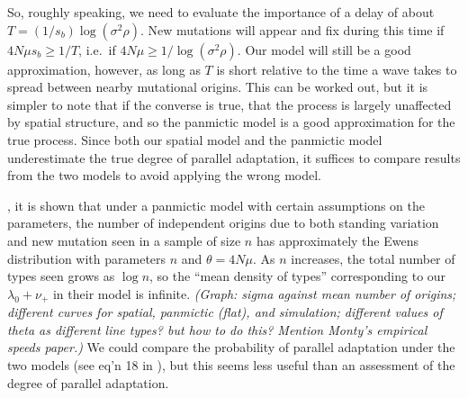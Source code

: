 \documentclass{article}
\newcommand{\marginnote}[1]{{\it\color{red}(#1)}}
\begin{document}
So, roughly speaking, we need to evaluate the importance of a delay of about $T = (1/s_b) \log (\sigma^2 \rho)$.
New mutations will appear and fix during this time if $4N\mu s_b \ge 1/T$,
i.e.\ if $4 N \mu \ge 1/\log (\sigma^2 \rho)$.
Our model will still be a good approximation, however, 
as long as $T$ is short relative to the time a wave takes to spread between nearby mutational origins.
This can be worked out,
but it is simpler to note that if the converse is true, 
that the process is largely unaffected by spatial structure,
and so the panmictic model is a good approximation for the true process.
Since both our spatial model and the panmictic model underestimate the true degree of parallel adaptation,
it suffices to compare results from the two models to avoid applying the wrong model.


\citet{softsweepsII}, it is shown that under a panmictic model with certain assumptions on the parameters,
the number of independent origins due to both standing variation and new mutation seen in a sample of size $n$
has approximately the Ewens distribution with parameters $n$ and $\theta = 4 N \mu$.
As $n$ increases, the total number of types seen grows as $\log n$, 
so the ``mean density of types'' corresponding to our $\lambda_0 + \nu_+$ in their model is infinite.
\marginnote{Graph: sigma against mean number of origins; different curves for spatial, panmictic (flat), and simulation;
different values of theta as different line types?  but how to do this?
Mention Monty's empirical speeds paper.}
We could compare the probability of parallel adaptation under the two models (see eq'n 18 in \citet{softsweepsII}),
but this seems less useful than an assessment of the degree of parallel adaptation.



\end{document}

